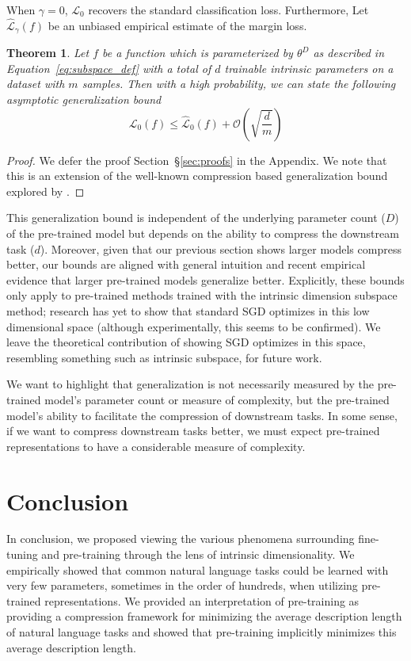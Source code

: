 \documentclass{article} \usepackage{iclr2020_conference,times}
\newtheorem{theorem}{Theorem}
\begin{document}
When $\gamma = 0$, $\mathcal{L}_0$ recovers the standard classification loss. Furthermore, Let $\hat{\mathcal{L}}_{\gamma}(f)$ be an unbiased empirical estimate of the margin loss. 
\begin{theorem}
Let $f$ be a function which is parameterized by $\theta^D$ as described in Equation~\ref{eq:subspace_def} with a total of $d$ trainable intrinsic parameters on a dataset with $m$ samples. Then with a high probability, we can state the following asymptotic generalization bound
\begin{equation}
    \mathcal{L}_{0}(f) \leq \hat{\mathcal{L}}_{0}(f) + \mathcal{O}\left(\sqrt{\frac{d}{m}}\right)
\end{equation}
\end{theorem}
\begin{proof}
We defer the proof Section~\S\ref{sec:proofs} in the Appendix. We note that this is an extension of the well-known compression based generalization bound explored by \cite{compression_generalization_gap}.  
\end{proof}

This generalization bound is independent of the underlying parameter count ($D$) of the pre-trained model but depends on the ability to compress the downstream task ($d$). Moreover, given that our previous section shows larger models compress better, our bounds are aligned with general intuition and recent empirical evidence that larger pre-trained models generalize better. Explicitly, these bounds only apply to pre-trained methods trained with the intrinsic dimension subspace method; research has yet to show that standard SGD optimizes in this low dimensional space (although experimentally, this seems to be confirmed). We leave the theoretical contribution of showing SGD optimizes in this space, resembling something such as intrinsic subspace, for future work.

We want to highlight that generalization is not necessarily measured by the pre-trained model's parameter count or measure of complexity, but the pre-trained model's ability to facilitate the compression of downstream tasks. In some sense, if we want to compress downstream tasks better, we must expect pre-trained representations to have a considerable measure of complexity.

\section{Conclusion}
In conclusion, we proposed viewing the various phenomena surrounding fine-tuning and pre-training through the lens of intrinsic dimensionality. We empirically showed that common natural language tasks could be learned with very few parameters, sometimes in the order of hundreds, when utilizing pre-trained representations.  We provided an interpretation of pre-training as providing a compression framework for minimizing the average description length of natural language tasks and showed that pre-training implicitly minimizes this average description length.
\end{document}
